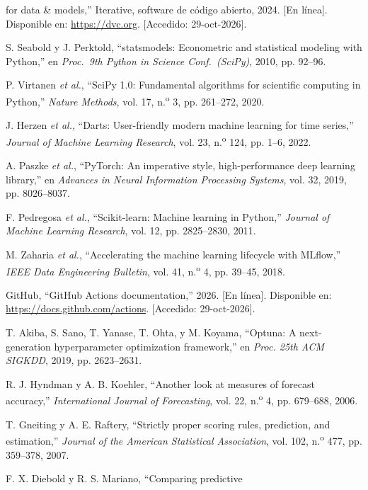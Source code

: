 \documentclass[12pt,letterpaper]{report}
\begin{document}
{\begin{enumerate}[label={[\arabic*]}, leftmargin=*, itemsep=0pt, parsep=0pt, topsep=0pt]
for data \& models,'' Iterative, software de c\'odigo abierto, 2024. [En l\'inea]. Disponible en: \url{https://dvc.org}. [Accedido: 29-oct-2026].
\item\label{bib:44} S. Seabold y J. Perktold, ``statsmodels: Econometric and statistical
modeling with Python,'' en \textit{Proc.\ 9th Python in Science Conf.\ (SciPy)}, 2010,
pp. 92--96.
\item\label{bib:45} P. Virtanen \textit{et al.}, ``SciPy 1.0: Fundamental algorithms for
scientific computing in Python,'' \textit{Nature Methods}, vol. 17, n.\textsuperscript{o} 3,
pp. 261--272, 2020.
\item\label{bib:46} J. Herzen \textit{et al.}, ``Darts: User-friendly modern machine
learning for time series,'' \textit{Journal of Machine Learning Research}, vol. 23,
n.\textsuperscript{o} 124, pp. 1--6, 2022.
\item\label{bib:47} A. Paszke \textit{et al.}, ``PyTorch: An imperative style,
high-performance deep learning library,'' en \textit{Advances in Neural Information
Processing Systems}, vol. 32, 2019, pp. 8026--8037.
\item\label{bib:48} F. Pedregosa \textit{et al.}, ``Scikit-learn: Machine learning in
Python,'' \textit{Journal of Machine Learning Research}, vol. 12, pp. 2825--2830, 2011.
\item\label{bib:49} M. Zaharia \textit{et al.}, ``Accelerating the machine learning
lifecycle with MLflow,'' \textit{IEEE Data Engineering Bulletin}, vol. 41, n.\textsuperscript{o} 4,
pp. 39--45, 2018.
\item\label{bib:50} GitHub, ``GitHub Actions documentation,'' 2026. [En línea].
Disponible en: \url{https://docs.github.com/actions}. [Accedido: 29-oct-2026].
\item\label{bib:51} T. Akiba, S. Sano, T. Yanase, T. Ohta, y M. Koyama, ``Optuna: A
next-generation hyperparameter optimization framework,'' en \textit{Proc. 25th ACM
SIGKDD}, 2019, pp. 2623--2631.
\item\label{bib:52} R. J. Hyndman y A. B. Koehler, ``Another look at measures of
forecast accuracy,'' \textit{International Journal of Forecasting}, vol. 22,
n.\textsuperscript{o} 4, pp. 679--688, 2006.
\item\label{bib:53} T. Gneiting y A. E. Raftery, ``Strictly proper scoring rules,
prediction, and estimation,'' \textit{Journal of the American Statistical Association},
vol. 102, n.\textsuperscript{o} 477, pp. 359--378, 2007.
\item\label{bib:54} F. X. Diebold y R. S. Mariano, ``Comparing predictive

\end{enumerate}}
\end{document}
